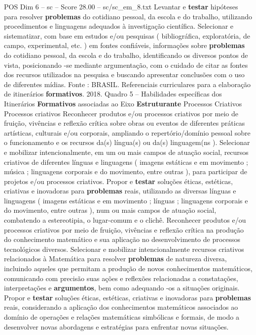 \begin{textsample}{POS Dim 6 – sc – Score 28.00 – sc/sc\_em\_8.txt}
Levantar e \textbf{testar} hipóteses para resolver \textbf{problemas} do cotidiano pessoal, da escola e do trabalho, utilizando procedimentos e linguagens adequados à investigação científica.
Selecionar e sistematizar, com base em estudos e/ou pesquisas ( bibliográfica, exploratória, de campo, experimental, etc. ) em fontes confiáveis, informações sobre \textbf{problemas} do cotidiano pessoal, da escola e do trabalho, identificando os diversos pontos de vista, posicionando -se mediante argumentação, com o cuidado de citar as fontes dos recursos utilizados na pesquisa e buscando apresentar conclusões com o uso de diferentes mídias.
Fonte : BRASIL.
Referenciais curriculares para a elaboração de itinerários \textbf{formativos}. 2018.
Quadro 5 – Habilidades específicas dos Itinerários \textbf{Formativos} associadas ao Eixo \textbf{Estruturante} Processos Criativos Processos criativos Reconhecer produtos e/ou processos criativos por meio de fruição, vivências e reflexão crítica sobre obras ou eventos de diferentes práticas artísticas, culturais e/ou corporais, ampliando o repertório/domínio pessoal sobre o funcionamento e os recursos da(s) língua(s) ou da(s) linguagem(ns ).
Selecionar e mobilizar intencionalmente, em um ou mais campos de atuação social, recursos criativos de diferentes línguas e linguagens ( imagens estáticas e em movimento ; música ; linguagens corporais e do movimento, entre outras ), para participar de projetos e/ou processos criativos.
Propor e \textbf{testar} soluções éticas, estéticas, criativas e inovadoras para \textbf{problemas} reais, utilizando as diversas línguas e linguagens ( imagens estáticas e em movimento ; línguas ; linguagens corporais e do movimento, entre outras ), num ou mais campos de atuação social, combatendo a estereotipia, o lugar-comum e o clichê.
Reconhecer produtos e/ou processos criativos por meio de fruição, vivências e reflexão crítica na produção do conhecimento matemático e sua aplicação no desenvolvimento de processos tecnológicos diversos.
Selecionar e mobilizar intencionalmente recursos criativos relacionados à Matemática para resolver \textbf{problemas} de natureza diversa, incluindo aqueles que permitam a produção de novos conhecimentos matemáticos, comunicando com precisão suas ações e reflexões relacionadas a constatações, interpretações e \textbf{argumentos}, bem como adequando -os a situações originais.
Propor e \textbf{testar} soluções éticas, estéticas, criativas e inovadoras para \textbf{problemas} reais, considerando a aplicação dos conhecimentos matemáticos associados ao domínio de operações e relações matemáticas simbólicas e formais, de modo a desenvolver novas abordagens e estratégias para enfrentar novas situações.

\end{textsample}
